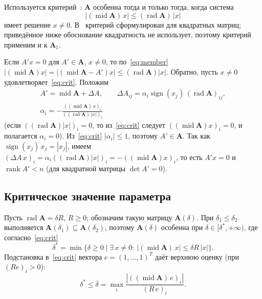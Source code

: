 \documentclass[a4paper, 14pt]{extarticle}
\begin{document}
Используется критерий~\cite[с.~52, теорема~1.2.5]{bazhenov}: $\mathbf{A}$ особенна тогда и только тогда, когда система
\begin{equation}
    |(\operatorname{mid}\mathbf{A})\,x| \le (\operatorname{rad}\mathbf{A})\,|x|
    \label{eq:crit}
\end{equation}
имеет решение $x \ne 0$. В~\cite{bazhenov} критерий сформулирован для квадратных матриц; приведённое ниже обоснование квадратность не использует, поэтому критерий применим и к $\mathbf{A}_1$.

Если $A'x = 0$ для $A' \in \mathbf{A}$, $x \ne 0$, то по~\eqref{eq:member} $|(\operatorname{mid}\mathbf{A})x| = |(\operatorname{mid}\mathbf{A} - A')x| \le (\operatorname{rad}\mathbf{A})|x|$. Обратно, пусть $x \ne 0$ удовлетворяет~\eqref{eq:crit}. Положим
\begin{equation}
    \begin{gathered}
        A' = \operatorname{mid}\mathbf{A} + \Delta A, \qquad
        \Delta A_{ij} = \alpha_i \operatorname{sign}(x_j)\,(\operatorname{rad}\mathbf{A})_{ij},\\
        \alpha_i = -\frac{((\operatorname{mid}\mathbf{A})\,x)_i}{((\operatorname{rad}\mathbf{A})\,|x|)_i}
    \end{gathered}
    \label{eq:construct}
\end{equation}
(если $((\operatorname{rad}\mathbf{A})|x|)_i = 0$, то из~\eqref{eq:crit} следует $((\operatorname{mid}\mathbf{A})x)_i = 0$, и полагается $\alpha_i = 0$). Из~\eqref{eq:crit} $|\alpha_i| \le 1$, поэтому $A' \in \mathbf{A}$. Так как $\operatorname{sign}(x_j)\,x_j = |x_j|$, имеем $(\Delta A\,x)_i = \alpha_i((\operatorname{rad}\mathbf{A})|x|)_i = -((\operatorname{mid}\mathbf{A})x)_i$, то есть $A'x = 0$ и $\operatorname{rank} A' < n$ (для квадратной матрицы $\det A' = 0$).

\subsection{Критическое значение параметра}

Пусть $\operatorname{rad}\mathbf{A} = \delta R$, $R \ge 0$; обозначим такую матрицу $\mathbf{A}(\delta)$. При $\delta_1 \le \delta_2$ выполняется $\mathbf{A}(\delta_1) \subseteq \mathbf{A}(\delta_2)$, поэтому $\mathbf{A}(\delta)$ особенна при $\delta \in [\delta^*, +\infty)$, где согласно~\eqref{eq:crit}
\begin{equation}
    \delta^* = \min\bigl\{\delta \ge 0 \;\big|\; \exists\, x \ne 0 :\ |(\operatorname{mid}\mathbf{A})\,x| \le \delta R\,|x|\bigr\}.
    \label{eq:deltastar}
\end{equation}
Подстановка в~\eqref{eq:crit} вектора $e = (1, \dots, 1)^T$ даёт верхнюю оценку (при $(Re)_i > 0$):
\begin{equation}
    \delta^* \le \overline{\delta} = \max_i \frac{|((\operatorname{mid}\mathbf{A})\,e)_i|}{(R\,e)_i}.
    \label{eq:upper}
\end{equation}
\end{document}
